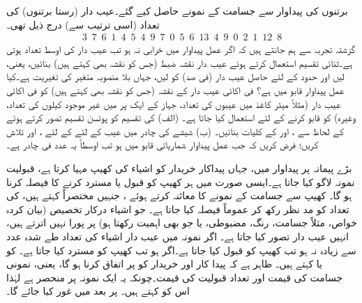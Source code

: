 برتنوں کی پیداوار سے جسامت  کے نمونے حاصل کیے گئے۔عیب دار (رستا برتنوں) کی تعداد (اسی ترتیب سے) درج ذیل تھی۔
\begin{align*}
3\,\,\,7\,\,\,6\,\,\,1\,\,\,4\,\,\,5\,\,\,4\,\,\,9\,\,\,7\,\,\,0\,\,\,5\,\,\,6\,\,\,13\,\,\,4\,\,\,9\,\,\,0\,\,\,2\,\,\,1\,\,\,12\,\,\,8
\end{align*} 
گزشتہ تجربہ سے ہم جانتے ہیں کہ اگر عمل پیداوار میں خرابی نہ ہو تب  عیب دار کی اوسط تعداد  ہوتی ہے۔ثنائی تقسیم استعمال کرتے ہوئے عیب دار نقشہ ضبط (جس کو  نقشہ بھی کہتے ہیں) بنائیں، یعنی،  لیں اور   حدود کے لئے حاصل عیب دار (فی صد)  کو  لیں، جہاں بلا منصوبہ متغیر  کی تغیریت  ہے۔کیا عمل پیداوار قابو میں ہے؟
\quad {} \quad
فی اکائی عیب دار کے نقشہ (جس کو  نقشہ بھی کہتے ہیں) کو فی اکائی عیب دار  (مثلاً  میٹر کاغذ میں عیبوں کی تعداد، جہاز کے ایک پر میں غیر موجود کیلوں کی تعداد، وغیرہ) کو قابو کرنے کے لئے استعمال کیا جاتا ہے۔ (الف)    کی تقسیم کو  پوئسن تقسیم تصور کرتے ہوئے   کے لحاظ سے ،   اور  کے کلیات بنائیں۔ (ب) شیشے کی چادر میں عیب کے لئے  کے لئے ،  اور  تلاش کریں؛ فرض کریں کہ جب عمل پیداوار شماریاتی قابو میں ہو تب اوسطاً یہ عدد  فی چادر ہے۔ 

بڑے پیمانہ پر پیداوار میں، جہاں پیداکار خریدار کو  اشیاء کی کھیپ مہیا کرتا ہے، قبولیت نمونہ لاگو کیا جاتا ہے۔ایسی صورت میں ہر کھیپ کو قبول یا مسترد کرنے کا فیصلہ کرنا ہو گا۔  کھیپ سے  جسامت کے نمونے کا معائنہ کرتے ہوئے  ، جنہیں مختصراً  کہتے ہیں،  کی تعداد کو مد نظر رکھ کر عموماً  فیصلہ کیا جاتا ہے۔ جو اشیاء درکار تخصیص  (بیان کردہ خواص، مثلاً جسامت، رنگ، مضبوطی، یا جو بھی اہمیت رکھتا ہو) پر پورا نہیں اترتے ہیں، انہیں عیب دار تصور کیا جاتا ہے۔ اگر نمونہ میں عیب دار اشیاء  کی تعداد  طے شدہ عدد  سے زیادہ نہ ہو تب کھیپ کو قبول کیا جاتا ہے۔اگر  ہو تب کھیپ کو مسترد کیا جاتا ہے۔ کو  یا  کہتے ہیں۔ ظاہر ہے کہ پیدا کار اور خریدار کو   پر اتفاق کرنا ہو گا، یعنی، نمونی جسامت  کی قیمت  اور تعداد قبولیت  کی قیمت۔چونکہ یہ ایک نمونہ پر منحصر ہے لہٰذا اس  کو  کہتے ہیں۔  پر بعد میں غور کیا جائے گا۔

